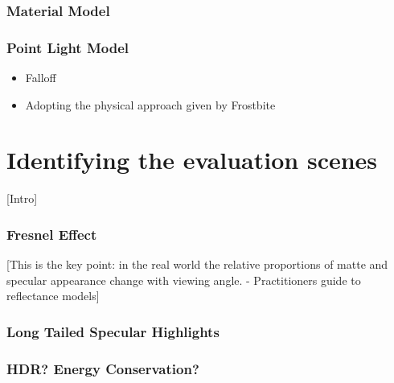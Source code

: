 \subsubsection{Material Model}

\subsubsection{Point Light Model}

\begin{itemize}
	\item Falloff
	\item Adopting the physical approach given by Frostbite
\end{itemize}

\section{Identifying the evaluation scenes}

[Intro]

\subsubsection{Fresnel Effect}

[This is the key point: in the real world the relative proportions of matte and specular appearance change with viewing
angle. - Practitioners guide to reflectance models]

\subsubsection{Long Tailed Specular Highlights}

\subsubsection{HDR? Energy Conservation?}
